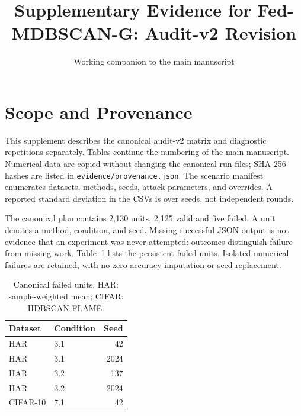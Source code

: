 \documentclass[journal]{IEEEtran}
\begin{document}
\title{Supplementary Evidence for Fed-MDBSCAN-G: Audit-v2 Revision}
\author{Working companion to the main manuscript}
\maketitle
\setcounter{table}{5}
\section{Scope and Provenance}
This supplement describes the canonical audit-v2 matrix and diagnostic repetitions separately. Tables continue the numbering of the main manuscript. Numerical data are copied without changing the canonical run files; SHA-256 hashes are listed in \texttt{evidence/provenance.json}. The scenario manifest enumerates datasets, methods, seeds, attack parameters, and overrides. A reported standard deviation in the CSVs is over seeds, not independent rounds.

The canonical plan contains 2,130 units, 2,125 valid and five failed. A unit denotes a method, condition, and seed. Missing successful JSON output is not evidence that an experiment was never attempted: outcomes distinguish failure from missing work. Table~\ref{tab:failed} lists the persistent failed units. Isolated numerical failures are retained, with no zero-accuracy imputation or seed replacement.
\begin{table}[!t]
\centering\footnotesize
\caption{Canonical failed units. HAR: sample-weighted mean; CIFAR: HDBSCAN FLAME.}\label{tab:failed}
\begin{tabular}{llr}\toprule Dataset & Condition & Seed\\\midrule
HAR & 3.1 & 42\\ HAR & 3.1 & 2024\\ HAR & 3.2 & 137\\ HAR & 3.2 & 2024\\ CIFAR-10 & 7.1 & 42\\\bottomrule
\end{tabular}\end{table}
\end{document}
